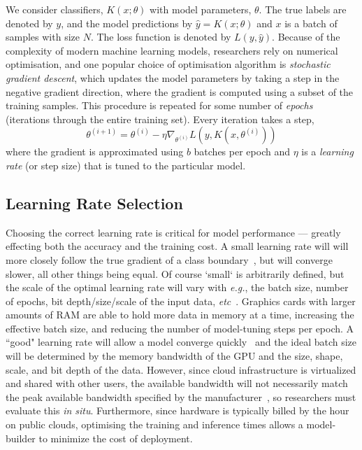 \documentclass[conference]{IEEEtran}
\begin{document}
We consider classifiers, $K(x; \theta)$ with model parameters, $\theta$. The true labels are denoted by $y$, and the model predictions by $\hat{y} = K(x; \theta)$ and $x$ is a batch of samples with size $N$. The loss function is denoted by $L(y, \hat{y})$.
Because of the complexity of modern machine learning models, researchers rely on numerical optimisation, and one popular choice of optimisation algorithm is \textit{stochastic gradient descent}, which updates the model parameters by taking a step in the negative gradient direction, where the gradient is computed using a subset of the training samples.
This procedure is repeated for some number of \textit{epochs} (iterations through the entire training set). Every iteration takes a step,
\begin{equation}
    \theta^{(i+1)} = \theta^{(i)} - \eta \nabla_{\theta^{(i)}} L(y, K(x, \theta^{(i)}))
    \label{eq:sgd}
\end{equation}
where the gradient is approximated using $b$ batches per epoch and $\eta$ is a \textit{learning rate} (or step size) that is tuned to the particular model.

\subsection{Learning Rate Selection}
\label{learning_rate}

Choosing the correct learning rate is critical for model performance --- greatly effecting both the accuracy and the training cost. A small learning rate will will more closely follow the true gradient of a class boundary~\cite{cao2019generalization}, but will converge slower, all other things being equal. Of course `small` is arbitrarily defined, but the scale of the optimal learning rate will vary with \textit{e.g.}, the batch size, number of epochs, bit depth/size/scale of the input data, \textit{etc}~\cite{granziol2022learning}. Graphics cards with larger amounts of RAM are able to hold more data in memory at a time, increasing the effective batch size, and reducing the number of model-tuning steps per epoch. A ``good" learning rate will allow a model converge quickly~\cite{smith2019super,granziol2022learning} and the ideal batch size will be determined by the memory bandwidth of the GPU and the size, shape, scale, and bit depth of the data. However, since cloud infrastructure is virtualized and shared with other users, the available bandwidth will not necessarily match the peak available bandwidth specified by the manufacturer~\cite{sajid2013cloud}, so researchers must evaluate this \textit{in situ}. Furthermore, since hardware is typically billed by the hour on public clouds, optimising the training and inference times allows a model-builder to minimize the cost of deployment. 
\end{document}
